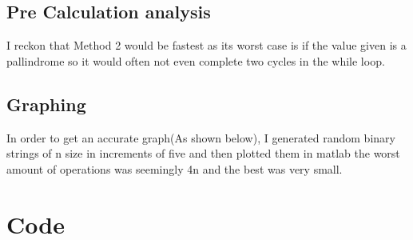 \documentclass{article}
\begin{document}
	\subsection{Pre Calculation analysis}
	I reckon that Method 2 would be fastest as its worst case is if the value given is a pallindrome so it would often not even complete two cycles in the while loop.
	\subsection{Graphing}
	In order to get an accurate graph(As shown below), I generated random binary strings of n size in increments of five and then plotted them in matlab the worst amount of operations was seemingly 4n and the best was very small.
	\section{Code}
	\newpage
\end{document}
